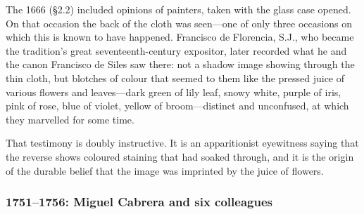 The 1666  (\S2.2) included opinions
of painters, taken with the glass case opened. On that occasion the
back of the cloth was seen---one of only three occasions on which
this is known to have happened. Francisco de Florencia, S.J., who
became the tradition's great seventeenth-century expositor, later
recorded what he and the canon Francisco de Siles saw there: not a
shadow image showing through the thin cloth, but blotches of colour
that seemed to them like the pressed juice of various flowers and
leaves---dark green of lily leaf, snowy white, purple of iris, pink
of rose, blue of violet, yellow of broom---distinct and unconfused,
at which they marvelled for some
time.

That testimony is doubly instructive. It is an apparitionist eyewitness
saying that the reverse shows coloured staining that had soaked
through, and it is the origin of the durable belief that the image was
imprinted by the juice of flowers.

\subsubsection*{1751--1756: Miguel Cabrera and six colleagues}

